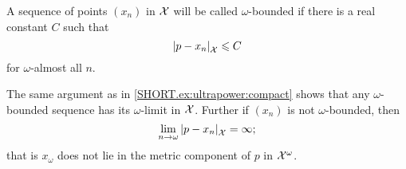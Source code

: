 A sequence of points $(x_n)$ in $\mathcal{X}$ will be called $\omega$-bounded if there is a real constant $C$ such that
\[\dist{p}{x_n}{\spc{X}}\le C\] 
for $\omega$-almost all $n$.

The same argument as in \ref{SHORT.ex:ultrapower:compact} shows that any $\omega$-bounded sequence has its $\omega$-limit in $\mathcal{X}$.
Further if $(x_n)$ is not  $\omega$-bounded, then 
\[\lim_{n\to\omega}\dist{p}{x_n}{\spc{X}}=\infty;\]
that is $x_\omega$ does not lie in the metric component of $p$ in $\mathcal{X}^\omega$.
